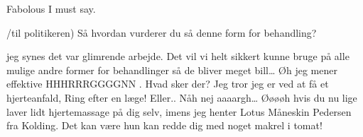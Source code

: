 \documentclass[a4paper,11pt]{article}
\begin{document}
\begin{sketch}
 Fabolous I must say. 

 /til politikeren) Så hvordan vurderer du så denne form for behandling?

 jeg synes det var glimrende arbejde. Det vil vi helt sikkert kunne bruge på alle mulige andre former for behandlinger så de bliver meget bill… Øh jeg mener effektive HHHRRRGGGGNN  . 
 Hvad sker der?
 Jeg tror jeg er ved at få et hjerteanfald, Ring efter en læge! Eller.. Nåh nej aaaargh…  
 Øøøøh hvis du nu lige laver lidt hjertemassage på dig selv, imens jeg henter Lotus Måneskin Pedersen fra Kolding. Det kan være hun kan redde dig med noget makrel i tomat!




\end{sketch}
\end{document}
